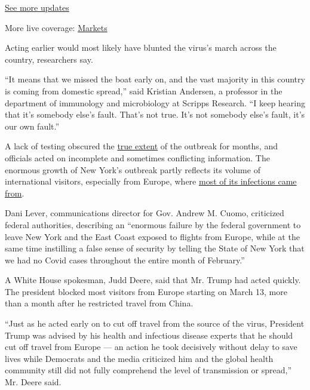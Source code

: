 \href{https://www.nytimes.com/2020/08/01/world/coronavirus-covid-19.html?action=click\&pgtype=Article\&state=default\&region=MAIN_CONTENT_1\&context=storylines_live_updates}{See
more updates}

More live coverage:
\href{https://www.nytimes.com/live/2020/07/31/business/stock-market-today-coronavirus?action=click\&pgtype=Article\&state=default\&region=MAIN_CONTENT_1\&context=storylines_live_updates}{Markets}

Acting earlier would most likely have blunted the virus's march across
the country, researchers say.

``It means that we missed the boat early on, and the vast majority in
this country is coming from domestic spread,'' said Kristian Andersen, a
professor in the department of immunology and microbiology at Scripps
Research. ``I keep hearing that it's somebody else's fault. That's not
true. It's not somebody else's fault, it's our own fault.''

A lack of testing obscured the
\href{https://www.nytimes.com/2020/04/23/us/coronavirus-early-outbreaks-cities.html}{true
extent} of the outbreak for months, and officials acted on incomplete
and sometimes conflicting information. The enormous growth of New York's
outbreak partly reflects its volume of international visitors,
especially from Europe, where
\href{https://www.nytimes.com/2020/04/08/science/new-york-coronavirus-cases-europe-genomes.html}{most
of its infections came from}.

Dani Lever, communications director for Gov. Andrew M. Cuomo, criticized
federal authorities, describing an ``enormous failure by the federal
government to leave New York and the East Coast exposed to flights from
Europe, while at the same time instilling a false sense of security by
telling the State of New York that we had no Covid cases throughout the
entire month of February.''

A White House spokesman, Judd Deere, said that Mr. Trump had acted
quickly. The president blocked most visitors from Europe starting on
March 13, more than a month after he restricted travel from China.

``Just as he acted early on to cut off travel from the source of the
virus, President Trump was advised by his health and infectious disease
experts that he should cut off travel from Europe --- an action he took
decisively without delay to save lives while Democrats and the media
criticized him and the global health community still did not fully
comprehend the level of transmission or spread,'' Mr. Deere said.

